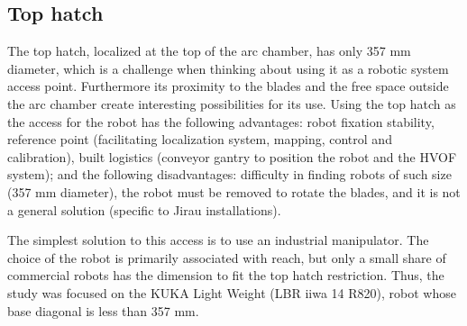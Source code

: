 \subsection{Top hatch}
The top hatch, localized at the top of the arc chamber, has only 357 mm
diameter, which is a challenge when thinking about using it as a robotic system access
point. Furthermore its proximity to the blades and the free space outside the
arc chamber create interesting possibilities for its use. Using the top hatch as
the access for the robot has the following advantages: robot fixation stability,
reference point (facilitating localization system, mapping, control and
calibration), built logistics (conveyor gantry to position the robot and the
HVOF system); and the following disadvantages: difficulty in finding robots of
such size (357 mm diameter), the robot must be removed to rotate the blades, and
it is not a general solution (specific to Jirau installations).



The simplest solution to this access is to use an industrial manipulator.
The choice of the robot is primarily associated with reach, but only a small
share of commercial robots has the dimension to fit the top hatch restriction.
Thus, the study was focused on the KUKA Light Weight (LBR iiwa 14 R820), robot whose base
diagonal is less than 357 mm.

